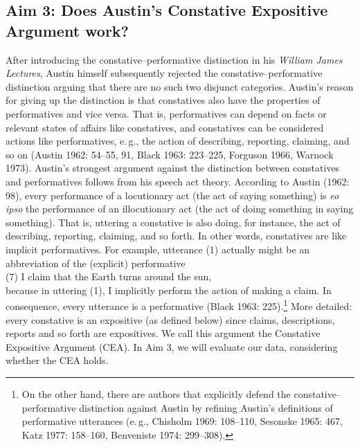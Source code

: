 \documentclass[egregdoesnotlikesansseriftitles,12pt]{scrartcl}
\begin{document}
\subsection{Aim 3: Does Austin's Constative Expositive Argument work?}
After introducing the constative--performative distinction in his \textit{William James Lectures}, Austin himself subsequently rejected the constative--performative distinction arguing that there are no such two disjunct categories. Austin's reason for giving up the distinction is that constatives also have the properties of performatives and vice versa. That is, performatives can depend on facts or relevant states of affairs like constatives, and constatives can be considered actions like performatives, e.\,g., the action of describing, reporting, claiming, and so on (Austin 1962: 54--55, 91, Black 1963: 223--225, Forguson 1966, Warnock 1973). Austin's strongest argument against the distinction between constatives and performatives follows from his speech act theory. According to Austin (1962: 98), every performance of a locutionary act (the act of saying something) is \textit{eo ipso} the performance of an illocutionary act (the act of doing something in saying something). That is, uttering a constative is also doing, for instance, the act of describing, reporting, claiming, and so forth. In other words, constatives are like implicit performatives. For example, utterance (1) actually might be an abbreviation of the (explicit) performative\\

(7) I claim that the Earth turns around the sun,\\

\noindent because in uttering (1), I implicitly perform the action of making a claim. In consequence, every utterance is a performative (Black 1963: 225).\footnote{On the other hand, there are authors that explicitly defend the constative--performative distinction against Austin by refining Austin's definitions of performative utterances (e.\,g., Chisholm 1969: 108--110, Sesonske 1965: 467, Katz 1977: 158--160, Benveniste 1974: 299--308).} More detailed: every constative is an expositive (as defined below) since claims, descriptions, reports and so forth are expositives. We call this argument the Constative Expositive Argument (CEA). In Aim 3, we will evaluate our data, considering whether the CEA holds.


\end{document}
